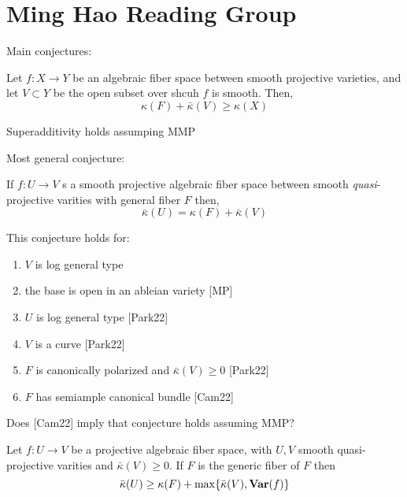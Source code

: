 \documentclass[12pt]{article}
\begin{document}
\section{Ming Hao Reading Group}

\newcommand{\barkap}{\bar{\kappa}}
\newcommand{\kapbar}{\bar{\kappa}}
\newcommand{\cO}{\mathcal{O}}

Main conjectures:

\begin{conj}[Superadditivity]
Let $f : X \to Y$ be an algebraic fiber space between smooth projective varieties, and let $V \subset Y$ be the open subset over shcuh $f$ is smooth. Then,
\[ \kappa(F) + \bar{\kappa}(V) \ge \kappa(X) \]
\end{conj}

\begin{theorem}[PS22]
Superadditivity holds assumping MMP
\end{theorem}


Most general conjecture:

\begin{conj}
If $f : U \to V$ s a smooth projective algebraic fiber space between smooth \textit{quasi}-projective varities with general fiber $F$ then,
\[ \bar{\kappa}(U) = \kappa(F) + \bar{\kappa}(V) \]
\end{conj}

\begin{theorem}
This conjecture holds for:
\begin{enumerate}
\item $V$ is log general type 
\item the base is open in an ableian variety [MP]
\item $U$ is log general type [Park22]
\item $V$ is a curve [Park22]
\item $F$ is canonically polarized and $\bar{\kappa}(V) \ge 0$ [Park22]
\item $F$ has semiample canonical bundle [Cam22]
\end{enumerate}
\end{theorem}

\begin{rmk}
Does [Cam22] imply that conjecture holds assuming MMP? 
\end{rmk}

\begin{conj}[open $C^+_{n,m}$]
Let $f : U \to V$ be a projective algebraic fiber space, with $U, V$ smooth quasi-projective varities and $\barkap(V) \ge 0$. If $F$ is the generic fiber of $F$ then
\[ \barkap(U) \ge \kappa(F) + \max \{ \barkap(V), \Var(f) \} \]
\end{conj}
\end{document}
